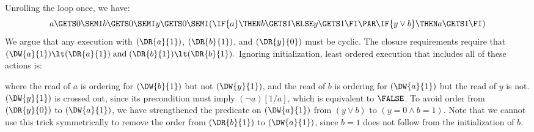 Unrolling the loop once, we have:
\begin{displaymath}
   a\GETS 0\SEMI
   b\GETS 0\SEMI
   y\GETS 0\SEMI
  (\IF{a}\THEN b\GETS 1\ELSE y\GETS 1\FI 
  \PAR
  \IF{y\lor b}\THEN a\GETS 1\FI)
\end{displaymath}
We argue that any execution with $(\DR{a}{1})$, $(\DR{b}{1})$, and
$(\DR{y}{0})$ must be cyclic.  The closure requirements require that
\begin{math}
  (\DW{a}{1})\lt(\DR{a}{1})
  \;\text{and}\;
  (\DR{b}{1})\lt(\DR{b}{1}).
\end{math}
Ignoring initialization, least ordered execution that includes all of these
actions is:
\begin{tikzdisplay}[node distance=1em]
\end{tikzdisplay}
where the read of $a$ is ordering for $(\DW{b}{1})$ but
not $(\DW{y}{1})$, and the read of $b$ is ordering for $(\DW{a}{1})$ but the
read of $y$ is not.  $(\DW{y}{1})$ is crossed out, since its
precondition must imply $(\lnot a)[1/a]$, which is equivalent to $\FALSE$.
To avoid order from $(\DR{y}{0})$ to $(\DW{a}{1})$, we
have strengthened the predicate on $(\DW{a}{1})$ from $(y\lor b)$ to
$(y=0\land b=1)$.  Note that we cannot use this trick symmetrically to remove
the order from $(\DR{b}{1})$ to $(\DW{a}{1})$, since $b=1$ does not follow
from the initialization of $b$.




